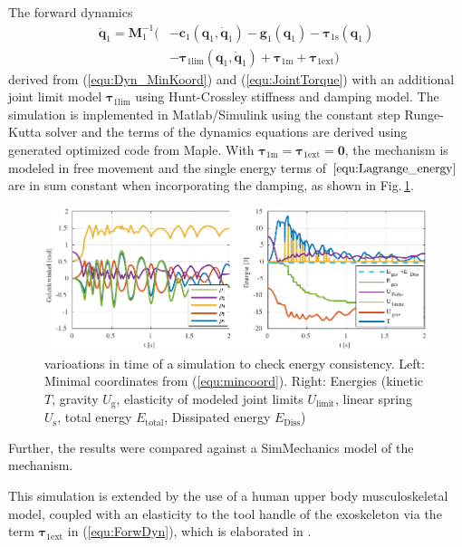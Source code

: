 \documentclass[letterpaper, 10 pt, conference]{ieeeconf}  %
\begin{document}
The forward dynamics
\begin{align}
\ddot{\bm{q}}_1 = \bm{M}_1^{-1}( &-\bm{c}_1(\bm{q}_1,\dot{\bm{q}}_1)-\bm{g}_1(\bm{q}_1) -\bm{\tau}_{1\mathrm{s}}(\bm{q}_1) \nonumber \\
& - \bm{\tau}_{1\mathrm{lim}}(\bm{q}_1,\dot{\bm{q}}_1)  + \bm{\tau}_{1\mathrm{m}} + \bm{\tau}_{1\mathrm{ext}})
\label{equ:ForwDyn}
\end{align}
derived from (\ref{equ:Dyn_MinKoord}) and (\ref{equ:JointTorque}) with an additional joint limit model $\bm{\tau}_{1\mathrm{lim}}$ using Hunt-Crossley stiffness and damping model.
The simulation is implemented in Matlab/Simulink using the constant step Runge-Kutta solver and the terms of the dynamics equations are derived using generated optimized code from Maple.
With $\bm{\tau}_{1\mathrm{m}} = \bm{\tau}_{1\mathrm{ext}} = \bm{0}$, the mechanism is modeled in free movement and the single energy terms of $\ref{equ:Lagrange_energy}$ are in sum constant when incorporating the damping, as shown in Fig.\,\ref{fig:SimulationEnergiekonsistenz}.
%
\begin{figure}[htb]
    \includegraphics{figures/KAS5m5_Gelenkgrenzmodell_q_E.pdf} 
    \caption{varioations in time of a simulation to check energy consistency. Left: Minimal coordinates from (\ref{equ:mincoord}). Right: Energies (kinetic $T$, gravity $U_\mathrm{g}$, elasticity of modeled joint limits $U_\mathrm{limit}$, linear spring $U_\mathrm{s}$, total energy $E_\mathrm{total}$, Dissipated energy $E_\mathrm{Diss}$)}
    \label{fig:SimulationEnergiekonsistenz}
\end{figure} 
%
Further, the results were compared against a SimMechanics model of the mechanism.

This simulation is extended by the use of a human upper body musculoskeletal model, coupled with an elasticity to the tool handle of the exoskeleton via the term $\bm{\tau}_{1\mathrm{ext}}$ in (\ref{equ:ForwDyn}), which is elaborated in \cite{KuehnHuSchHad2018}.
\end{document}
